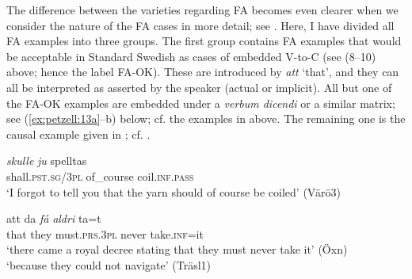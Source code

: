 \documentclass[output=paper,colorlinks,citecolor=brown,draft,draftmode]{langscibook}
\begin{document}
The difference between the varieties regarding FA becomes even clearer when we consider the nature of the FA cases in more detail; see . Here, I have divided all FA examples into three groups. The first group contains FA examples that would be acceptable in Standard Swedish as cases of embedded V-to-C (see (8–10) above; hence the label FA-OK). These are introduced by \textit{att} ‘that’, and they can all be interpreted as asserted by the speaker (actual or implicit). All but one of the FA-OK examples are embedded under a \textit{verbum dicendi} or a similar matrix; see (\ref{ex:petzell:13a}–b) below; cf. the examples in  above. The remaining one is the causal example given in ; cf. .


\ea\label{ex:petzell:13}

\gll    \textit{{skulle}} \textit{{ju}}        spelltas    \\
    shall.\textsc{pst.sg}/3\textsc{pl}  of\_course  coil.\textsc{inf}.\textsc{pass}\\
\glt `I forgot to tell you that the yarn should of course be coiled' (Värö3)  \\


\gll    att      da \textit{{få}} \textit{{aldri}} ta=t        \\
    that    they    must.\textsc{prs}.3\textsc{pl}  never    take.\textsc{inf}=it    \\
\glt `there came a royal decree stating that they must never take it’ (Öxn)    \\

\glt `because they could not navigate’ (Träsl1)
\z
\z
\end{document}
